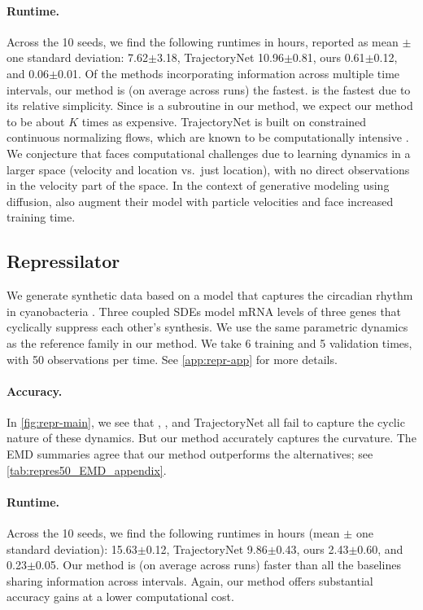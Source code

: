 \paragraph{Runtime.} Across the 10 seeds, we find the following runtimes in hours, reported as mean $\pm$ one standard deviation: \dmsbname{} 7.62$\pm$3.18, TrajectoryNet 10.96$\pm$0.81, ours 0.61$\pm$0.12, and \vanilla{} 0.06$\pm$0.01. Of the methods incorporating information across multiple time intervals, our method is (on average across runs) the fastest.
\vanilla{} is the fastest due to its relative simplicity. Since \vanilla{} is a subroutine in our method, we expect our method to be about $K$ times as expensive. TrajectoryNet is built on constrained continuous normalizing flows, which are known to be computationally intensive \citep{grathwohl2018ffjord}.
We conjecture that \dmsbname{} faces computational challenges due to learning dynamics in a larger space (velocity and location vs.\ just location), with no direct observations in the velocity part of the space. In the context of generative modeling using diffusion, \citet{dockhorn2021score} also augment their model with particle velocities and face increased training time.

\subsection{Repressilator} 
\label{sec:represmain}
We generate synthetic data based on a model that captures the circadian rhythm in cyanobacteria \citep{nakajima2005reconstitution}. Three coupled SDEs model mRNA levels of three genes that cyclically suppress each other's synthesis. We use the same parametric dynamics as the reference family in our method. We take 6 training and 5 validation times, with 50 observations per time. See \cref{app:repr-app} for more details.

\paragraph{Accuracy.} In \cref{fig:repr-main}, we see that \vanilla{}, \dmsbname{}, and TrajectoryNet all fail to capture the cyclic nature of these dynamics. But our method accurately captures the curvature. The EMD summaries agree that our method outperforms the alternatives; see \cref{tab:repres50_EMD_appendix}.

\paragraph{Runtime.} Across the 10 seeds, we find the following runtimes in hours (mean $\pm$ one standard deviation): \dmsbname{} 15.63$\pm$0.12, TrajectoryNet 9.86$\pm$0.43, ours 2.43$\pm$0.60, and \vanilla{} 0.23$\pm$0.05. Our method is (on average across runs) faster than all the baselines sharing information across intervals.
Again, our method offers substantial accuracy gains at a lower computational cost.

